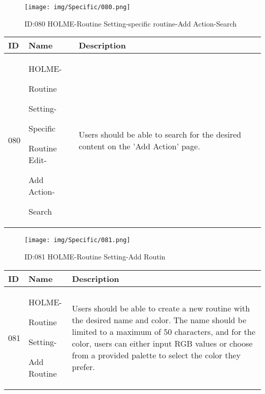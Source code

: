 \documentclass[conference]{IEEEtran}
\begin{document}
\begin{enumerate}
\begin{figure}[h]
\centering                                         
\texttt{[image: img/Specific/080.png]}
\caption{ID:080 HOLME-Routine Setting-specific routine-Add Action-Search}
\end{figure}
\begin{table}[h]
\def\arraystretch{1.2} \small
    \begin{tabular}{|p{1cm}|p{1.8cm}|p{5.0cm}|}
        \hline
        ID & Name & Description\\ \hline
         080 \par  & HOLME-\par Routine \par Setting- \par Specific  \par Routine Edit- \par Add Action- \par Search & 
         Users should be able to search for the desired content on the 'Add Action' page.
         \\ \hline
    \end{tabular}
\end{table}
\clearpage

\begin{figure}[h]
\centering                                         
\texttt{[image: img/Specific/081.png]}
\caption{ID:081 HOLME-Routine Setting-Add Routin}
\end{figure}
\begin{table}[h]
\def\arraystretch{1.2} \small
    \begin{tabular}{|p{1cm}|p{1.8cm}|p{5.0cm}|}
        \hline
        ID & Name & Description\\ \hline
         081 \par  & HOLME-\par Routine \par Setting- \par Add Routine & 
Users should be able to create a new routine with the desired name and color. The name should be limited to a maximum of 50 characters, and for the color, users can either input RGB values or choose from a provided palette to select the color they prefer.
         \\ \hline
    \end{tabular}
\end{table}
\vspace{3cm}


\end{enumerate}
\end{document}
